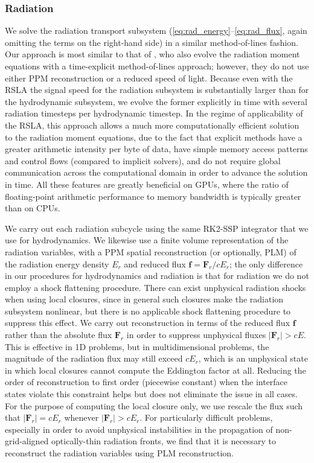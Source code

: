 \documentclass[fleqn,usenatbib]{mnras}
\begin{document}
\subsubsection{Radiation}
\label{sssec:radiation}

We solve the radiation transport subsystem (\autoref{eq:rad_energy}--\autoref{eq:rad_flux}, again omitting the terms on the right-hand side) in a similar method-of-lines fashion. Our approach is most similar to that of \cite{Skinner_2019}, who also evolve the radiation moment equations with a time-explicit method-of-lines approach; however, they do not use either PPM reconstruction or a reduced speed of light. Because even with the RSLA the signal speed for the radiation subsystem is substantially larger than for the hydrodynamic subsystem, we evolve the former explicitly in time with several radiation timesteps per hydrodynamic timestep. In the regime of applicability of the RSLA, this approach allows a much more computationally efficient solution to the radiation moment equations, due to the fact that explicit methods have a greater arithmetic intensity per byte of data, have simple memory access patterns and control flows (compared to implicit solvers), and do not require global communication across the computational domain in order to advance the solution in time. All these features are greatly beneficial on GPUs, where the ratio of floating-point arithmetic performance to memory bandwidth is typically greater than on CPUs.

We carry out each radiation subcycle using the same RK2-SSP integrator \citep{Shu_1988} that we use for hydrodynamics. We likewise use a finite volume representation of the radiation variables, with a PPM spatial reconstruction (or optionally, PLM) of the radiation energy density $E_r$ and reduced flux $\mathbf{f} = \mathbf{F}_r / cE_r$; the only difference in our procedures for hydrodynamics and radiation is that for radiation we do not employ a shock flattening procedure. There can exist unphysical radiation shocks when using local closures, since in general such closures make the radiation subsystem nonlinear, but there is no applicable shock flattening procedure to suppress this effect. We carry out reconstruction in terms of the reduced flux $\mathbf{f}$ rather than the absolute flux $\mathbf{F}_r$ in order to suppress unphysical fluxes $|\mathbf{F}_r| > cE$. This is effective in 1D problems, but in multidimensional problems, the magnitude of the radiation flux may still exceed $cE_r$, which is an unphysical state in which local closures cannot compute the Eddington factor at all. Reducing the order of reconstruction to first order (piecewise constant) when the interface states violate this constraint helps but does not eliminate the issue in all cases. For the purpose of computing the local closure only, we use rescale the flux such that $|\mathbf{F}_r| = cE_r$ whenever $|\mathbf{F}_r| > cE_r$.  For particularly difficult problems, especially in order to avoid unphysical instabilities in the propagation of non-grid-aligned optically-thin radiation fronts, we find that it is necessary to reconstruct the radiation variables using PLM reconstruction.
\end{document}
